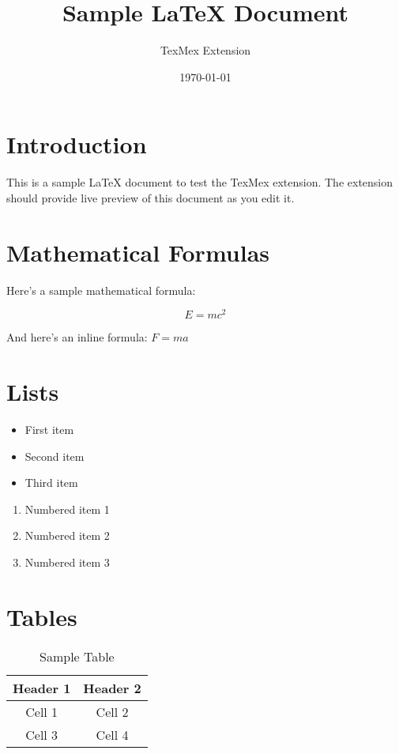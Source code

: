 \documentclass{article}
\title{Sample LaTeX Document}
\author{TexMex Extension}
\date{\today}
\begin{document}
\maketitle

\section{Introduction}
This is a sample LaTeX document to test the TexMex extension. The extension should provide live preview of this document as you edit it.

\section{Mathematical Formulas}
Here's a sample mathematical formula:

\begin{equation}
    E = mc^2
\end{equation}

And here's an inline formula: $F = ma$

\section{Lists}
\begin{itemize}
    \item First item
    \item Second item
    \item Third item
\end{itemize}

\begin{enumerate}
    \item Numbered item 1
    \item Numbered item 2
    \item Numbered item 3
\end{enumerate}

\section{Tables}
\begin{table}[h]
    \centering
    \begin{tabular}{|c|c|}
        \hline
        Header 1 & Header 2 \\
        \hline
        Cell 1 & Cell 2 \\
        Cell 3 & Cell 4 \\
        \hline
    \end{tabular}
    \caption{Sample Table}
\end{table}
\end{document}
